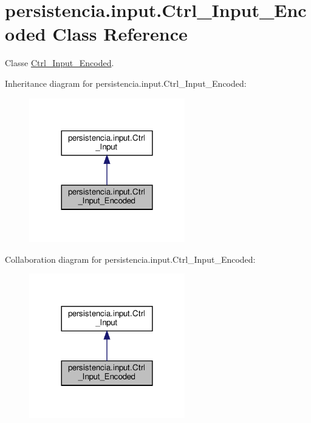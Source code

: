 \hypertarget{classpersistencia_1_1input_1_1Ctrl__Input__Encoded}{}\section{persistencia.\+input.\+Ctrl\+\_\+\+Input\+\_\+\+Encoded Class Reference}
\label{classpersistencia_1_1input_1_1Ctrl__Input__Encoded}


Classe \hyperlink{classpersistencia_1_1input_1_1Ctrl__Input__Encoded}{Ctrl\+\_\+\+Input\+\_\+\+Encoded}.  




Inheritance diagram for persistencia.\+input.\+Ctrl\+\_\+\+Input\+\_\+\+Encoded\+:
\nopagebreak
\begin{figure}[H]
\begin{center}
\leavevmode
\includegraphics[width=192pt]{classpersistencia_1_1input_1_1Ctrl__Input__Encoded__inherit__graph}
\end{center}
\end{figure}


Collaboration diagram for persistencia.\+input.\+Ctrl\+\_\+\+Input\+\_\+\+Encoded\+:
\nopagebreak
\begin{figure}[H]
\begin{center}
\leavevmode
\includegraphics[width=192pt]{classpersistencia_1_1input_1_1Ctrl__Input__Encoded__coll__graph}
\end{center}
\end{figure}
